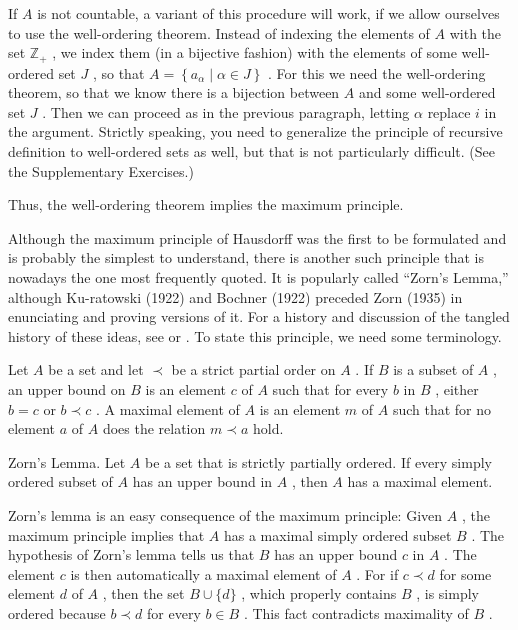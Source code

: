 If \(A\) is not countable, a variant of this procedure will work, if we allow ourselves to use the well-ordering theorem. Instead of indexing the elements of \(A\) with the set \({\mathbb{Z}}_{ + }\) , we index them (in a bijective fashion) with the elements of some well-ordered set \(J\) , so that \(A = \left\{  {{a}_{\alpha } \mid  \alpha  \in  J}\right\}\) . For this we need the well-ordering theorem, so that we know there is a bijection between \(A\) and some well-ordered set \(J\) . Then we can proceed as in the previous paragraph, letting \(\alpha\) replace \(i\) in the argument. Strictly speaking, you need to generalize the principle of recursive definition to well-ordered sets as well, but that is not particularly difficult. (See the Supplementary Exercises.)

Thus, the well-ordering theorem implies the maximum principle.

Although the maximum principle of Hausdorff was the first to be formulated and is probably the simplest to understand, there is another such principle that is nowadays the one most frequently quoted. It is popularly called ``Zorn's Lemma,'' although Ku-ratowski (1922) and Bochner (1922) preceded Zorn (1935) in enunciating and proving versions of it. For a history and discussion of the tangled history of these ideas, see \cite{Campbell1978} or \cite{Moore1982}. To state this principle, we need some terminology.

\begin{definition} Let \(A\) be a set and let \(\prec\) be a strict partial order on \(A\) . If \(B\) is a subset of \(A\) , an upper bound on \(B\) is an element \(c\) of \(A\) such that for every \(b\) in \(B\) , either \(b = c\) or \(b \prec  c\) . A maximal element of \(A\) is an element \(m\) of \(A\) such that for no element \(a\) of \(A\) does the relation \(m \prec  a\) hold.
\end{definition}

Zorn's Lemma. Let \(A\) be a set that is strictly partially ordered. If every simply ordered subset of \(A\) has an upper bound in \(A\) , then \(A\) has a maximal element.

Zorn’s lemma is an easy consequence of the maximum principle: Given \(A\) , the maximum principle implies that \(A\) has a maximal simply ordered subset \(B\) . The hypothesis of Zorn’s lemma tells us that \(B\) has an upper bound \(c\) in \(A\) . The element \(c\) is then automatically a maximal element of \(A\) . For if \(c \prec  d\) for some element \(d\) of \(A\) , then the set \(B \cup  \{ d\}\) , which properly contains \(B\) , is simply ordered because \(b \prec  d\) for every \(b \in  B\) . This fact contradicts maximality of \(B\) .


